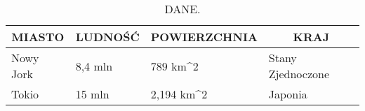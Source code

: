 \begin{table}[h]
\begin{tabular}{|l|l|l|l|}
\hline
\multicolumn{1}{|c|}{\textbf{MIASTO}} & \multicolumn{1}{c|}{\textbf{LUDNOŚĆ}} & \multicolumn{1}{c|}{\textbf{POWIERZCHNIA}} & \multicolumn{1}{c|}{\textbf{KRAJ}} \\ \hline
Nowy Jork                             & 8,4 mln                               & 789 km\textasciicircum{}2                  & Stany Zjednoczone                  \\ \hline
Tokio                                 & 15 mln                                & 2,194 km\textasciicircum{}2                & Japonia                            \\ \hline
\end{tabular}
\caption{DANE.}
\centering
\label{tab:tabelka1}
\end{table}